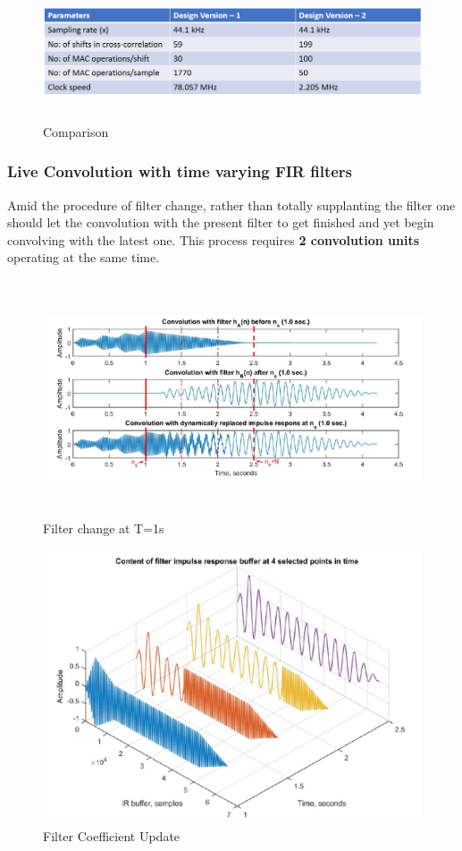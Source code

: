 \documentclass[BTech]{nitkdiss}
\begin{document}
\begin{figure}[h!]
    \centering
    \includegraphics[width = \textwidth, height = 4cm]{parameters.png}
    \caption{Comparison}
    \label{fig:comparison}
\end{figure}

\subsubsection{Live Convolution with time varying FIR filters}
Amid the procedure of filter change, rather than totally supplanting the filter one should let the convolution with the present filter to get finished and yet begin convolving with the latest one. This process requires \textbf{2 convolution units} operating at the same time.
\begin{figure}[h!]
\centering
\includegraphics[width = \textwidth, height = 7cm]{update.png}
\caption{Filter change at T=1s}
\label{fig : live}
\end{figure}
\begin{figure}[h!]
    \centering
    \includegraphics{coeff_update.png}
    \caption{Filter Coefficient Update}
    \label{fig: coeff_update}
\end{figure}
\end{document}
